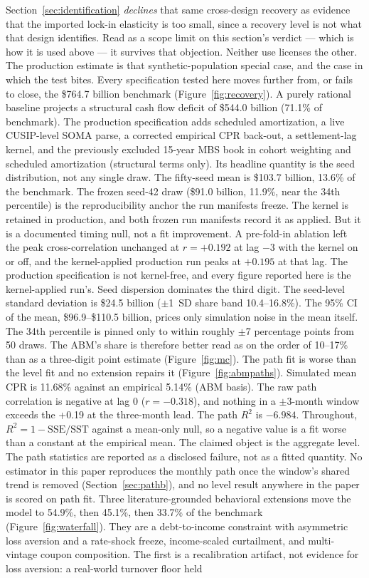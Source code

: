 \documentclass[12pt]{article}
\begin{document}
Section~\ref{sec:identification} \emph{declines} that same cross-design recovery as evidence that the imported lock-in elasticity is too small, since a recovery level is not what that design identifies. Read as a scope limit on this section's verdict --- which is how it is used above --- it survives that objection. Neither use licenses the other. The production estimate is that synthetic-population special case, and the case in which the test bites. Every specification tested here moves further from, or fails to close, the \$764.7 billion benchmark (Figure~\ref{fig:recovery}). A purely rational baseline projects a structural cash flow deficit of \$544.0 billion (71.1\% of benchmark). The production specification adds scheduled amortization, a live CUSIP-level SOMA parse, a corrected empirical CPR back-out, a settlement-lag kernel, and the previously excluded 15-year MBS book in cohort weighting and scheduled amortization (structural terms only). Its headline quantity is the seed distribution, not any single draw. The fifty-seed mean is \$103.7 billion, 13.6\% of the benchmark. The frozen seed-42 draw (\$91.0 billion, 11.9\%, near the 34th percentile) is the reproducibility anchor the run manifests freeze. The kernel is retained in production, and both frozen run manifests record it as applied. But it is a documented timing null, not a fit improvement. A pre-fold-in ablation left the peak cross-correlation unchanged at $r = +0.192$ at lag $-3$ with the kernel on or off, and the kernel-applied production run peaks at $+0.195$ at that lag. The production specification is not kernel-free, and every figure reported here is the kernel-applied run's. Seed dispersion dominates the third digit. The seed-level standard deviation is \$24.5 billion ($\pm$1~SD share band 10.4--16.8\%). The 95\% CI of the mean, \$96.9--\$110.5 billion, prices only simulation noise in the mean itself. The 34th percentile is pinned only to within roughly $\pm$7 percentage points from 50 draws. The ABM's share is therefore better read as on the order of 10--17\% than as a three-digit point estimate (Figure~\ref{fig:mc}). The path fit is worse than the level fit and no extension repairs it (Figure~\ref{fig:abmpaths}). Simulated mean CPR is 11.68\% against an empirical 5.14\% (ABM basis). The raw path correlation is negative at lag 0 ($r = -0.318$), and nothing in a $\pm$3-month window exceeds the +0.19 at the three-month lead. The path $R^2$ is $-6.984$. Throughout, $R^2 = 1-\mathrm{SSE}/\mathrm{SST}$ against a mean-only null, so a negative value is a fit worse than a constant at the empirical mean. The claimed object is the aggregate level. The path statistics are reported as a disclosed failure, not as a fitted quantity. No estimator in this paper reproduces the monthly path once the window's shared trend is removed (Section~\ref{sec:pathb}), and no level result anywhere in the paper is scored on path fit. Three literature-grounded behavioral extensions move the model to 54.9\%, then 45.1\%, then 33.7\% of the benchmark (Figure~\ref{fig:waterfall}). They are a debt-to-income constraint with asymmetric loss aversion and a rate-shock freeze, income-scaled curtailment, and multi-vintage coupon composition. The first is a recalibration artifact, not evidence for loss aversion: a real-world turnover floor held 
\end{document}
